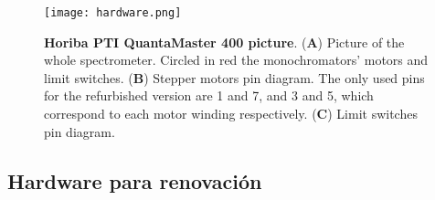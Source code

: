 \begin{figure}[h]
     \centering
     \texttt{[image: hardware.png]}
     \caption{\textbf{Horiba PTI QuantaMaster 400 picture}.  (\textbf{A}) Picture of the whole spectrometer. Circled in red the monochromators' motors and limit switches. (\textbf{B}) Stepper motors pin diagram. The only used pins for the refurbished version are 1 and 7, and 3 and 5, which correspond to each motor winding respectively. (\textbf{C}) Limit switches pin diagram.}
     \label{fig:hardware}
\end{figure}


\subsection{Hardware para renovación}

